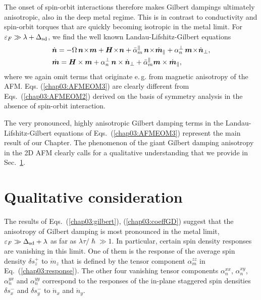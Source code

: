
The onset of spin-orbit interactions therefore makes Gilbert dampings ultimately anisotropic, also in the deep metal regime. This is in contrast to conductivity and spin-orbit torques that are quickly becoming isotropic in the metal limit. 
For $\varepsilon_F\gg \lambda+\Delta_{\text{sd}}$, we find the well known Landau-Lifshitz-Gilbert equations
\begin{align}
&\dot{\bb{n}} = -\Omega\, \bb{n}\!\times\!\bb{m} +\bb{H}\!\times\!\bb{n}+\bar{\alpha}^\parallel_m\,\bb{n}\!\times\!\dot{\bb{m}}_\parallel+\alpha_n^\perp\,\bb{m}\!\times\! \dot{\bb{n}}_\perp,\n\\
&\dot{\bb{m}} =\bb{H}\times\bb{m}+\alpha_n^\perp\,\bb{n} \times \dot{\bb{n}}_\perp
+\bar{\alpha}_m^\parallel \bb{m} \times \dot{\bb{m}}_\parallel,
\label{chap03:AFMEOM3}
\end{align}
where we again omit terms that originate e.\,g. from magnetic anisotropy of the AFM. 
Eqs. (\ref{chap03:AFMEOM3}) are clearly different from Eqs.~(\ref{chap03:AFMEOM2}) derived on the basis of symmetry analysis in the absence of spin-orbit interaction. 

The very pronounced, highly anisotropic Gilbert damping terms in the Landau-Lifshitz-Gilbert equations of Eqs.~(\ref{chap03:AFMEOM3}) represent the main result of our Chapter. The phenomenon of the giant Gilbert damping anisotropy in the 2D AFM clearly calls for a qualitative understanding that we provide in Sec.~\ref{chap03:sec:qual}.

\section{Qualitative consideration}\label{chap03:sec:qual}

The results of Eqs.~(\ref{chap03:gilbert}), (\ref{chap03:coeffGD}) suggest that the anisotropy of Gilbert damping is most pronounced in the metal limit, $\varepsilon_F\gg \Delta_{\text{sd}}+\lambda$ as far as $\lambda \tau/\hslash \gg 1$. In particular, certain spin density responses are vanishing in this limit. One of them is the response of the average spin density $\delta s_z^+$ to $\dot{m}_z$ that is defined by the tensor component $\alpha^{zz}_m$ in Eq.~(\ref{chap03:response}). The other four vanishing tensor components $\alpha^{xx}_n$, $\alpha^{xy}_n$, $\alpha^{yx}_n$ and $\alpha^{yy}_n$ correspond to the responses of the in-plane staggered spin densities $\delta s_{x}^-$ and $\delta s_{y}^-$ to $\dot{n}_x$ and $\dot{n}_y$.  


